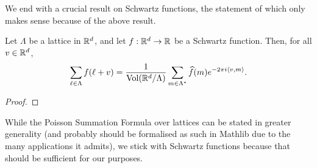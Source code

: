 We end with a crucial result on Schwartz functions, the statement of which only makes sense because of the above result.
\begin{theorem}\label{thm:Poisson-summation-formula}
  Let $\Lambda$ be a lattice in $\mathbb{R}^d$, and let $f:\mathbb{R}^d\to\mathbb{R}$ be a Schwartz function. Then, for all $v \in \mathbb{R}^d$,
  \[
    \sum_{\ell\in\Lambda}f(\ell + v) = \frac{1}{\operatorname{Vol}\!\left(\mathbb{R}^d/\Lambda\right)} \sum_{m\in\Lambda^*}\widehat{f}(m) e^{-2\pi i \left\langle v, m \right\rangle}.
  \]
\end{theorem}
\begin{proof}
\end{proof}

While the Poisson Summation Formula over lattices can be stated in greater generality (and probably should be formalised as such in Mathlib due to the many applications it admits), we stick with Schwartz functions because that should be sufficient for our purposes.
